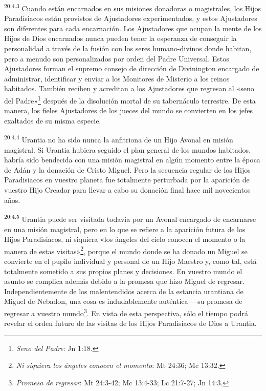 \par
\textsuperscript{20:4.3} Cuando están encarnados en sus misiones donadoras o magistrales, los Hijos Paradisiacos están provistos de Ajustadores experimentados, y estos Ajustadores son diferentes para cada encarnación. Los Ajustadores que ocupan la mente de los Hijos de Dios encarnados nunca pueden tener la esperanza de conseguir la personalidad a través de la fusión con los seres humano-divinos donde habitan, pero a menudo son personalizados por orden del Padre Universal. Estos Ajustadores forman el supremo consejo de dirección de Divinington encargado de administrar, identificar y enviar a los Monitores de Misterio a los reinos habitados. También reciben y acreditan a los Ajustadores que regresan al «seno del Padre»\footnote{\textit{Seno del Padre}: Jn 1:18.} después de la disolución mortal de su tabernáculo terrestre. De esta manera, los fieles Ajustadores de los jueces del mundo se convierten en los jefes exaltados de su misma especie.

\par
\textsuperscript{20:4.4} Urantia no ha sido nunca la anfitriona de un Hijo Avonal en misión magistral. Si Urantia hubiera seguido el plan general de los mundos habitados, habría sido bendecida con una misión magistral en algún momento entre la época de Adán y la donación de Cristo Miguel. Pero la secuencia regular de los Hijos Paradisiacos en vuestro planeta fue totalmente perturbada por la aparición de vuestro Hijo Creador para llevar a cabo su donación final hace mil novecientos años.

\par
\textsuperscript{20:4.5} Urantia puede ser visitada todavía por un Avonal encargado de encarnarse en una misión magistral, pero en lo que se refiere a la aparición futura de los Hijos Paradisiacos, ni siquiera «los ángeles del cielo conocen el momento o la manera de estas visitas»\footnote{\textit{Ni siquiera los ángeles conocen el momento}: Mt 24:36; Mc 13:32.}, porque el mundo donde se ha donado un Miguel se convierte en el pupilo individual y personal de un Hijo Maestro y, como tal, está totalmente sometido a sus propios planes y decisiones. En vuestro mundo el asunto se complica además debido a la promesa que hizo Miguel de regresar. Independientemente de los malentendidos acerca de la estancia urantiana de Miguel de Nebadon, una cosa es indudablemente auténtica ---su promesa de regresar a vuestro mundo\footnote{\textit{Promesa de regresar}: Mt 24:3-42; Mc 13:4-33; Lc 21:7-27; Jn 14:3.}. En vista de esta perspectiva, sólo el tiempo podrá revelar el orden futuro de las visitas de los Hijos Paradisiacos de Dios a Urantia.

